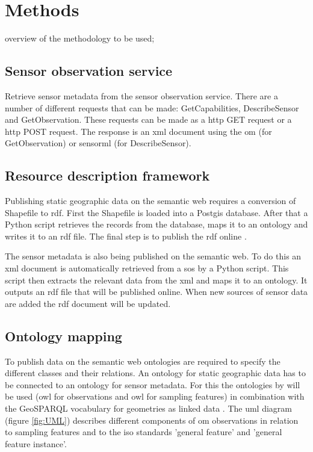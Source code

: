 \chapter{Methods}
\label{chap:methods}

overview of the methodology to be used;

\section{Sensor observation service}
Retrieve sensor metadata from the sensor observation service. There are a number of different requests that can be made: GetCapabilities, DescribeSensor and GetObservation. These requests can be made as a \ac{http} GET request or a \ac{http} POST request. The response is an \ac{xml} document using the \ac{om} (for GetObservation) or \ac{sensorml} (for DescribeSensor).

\section{Resource description framework}
Publishing static geographic data on the semantic web requires a conversion of Shapefile to \ac{rdf}. First the Shapefile is loaded into a Postgis database. After that a Python script retrieves the records from the database, maps it to an ontology and writes it to an \ac{rdf} file. The final step is to publish the \ac{rdf} online \citep{LD:Missier}. 

The sensor metadata is also being published on the semantic web. To do this an \ac{xml} document is automatically retrieved from a \ac{sos} by a Python script. This script then extracts the relevant data from the \ac{xml} and maps it to an ontology. It outputs an \ac{rdf} file that will be published online. When new sources of sensor data are added the \ac{rdf} document will be updated.   

\section{Ontology mapping}
To publish data on the semantic web ontologies are required to specify the different classes and their relations. An ontology for static geographic data has to be connected to an ontology for sensor metadata. For this the ontologies by \cite{SSW:Cox4} will be used (\ac{owl} for observations and \ac{owl} for sampling features) in combination with the GeoSPARQL vocabulary for geometries as linked data \citep{LD:OGC}. The \ac{uml} diagram (figure \ref{fig:UML}) describes different components of \ac{om} observations in relation to sampling features and to the \ac{iso} standards 'general feature' and 'general feature instance'.  

